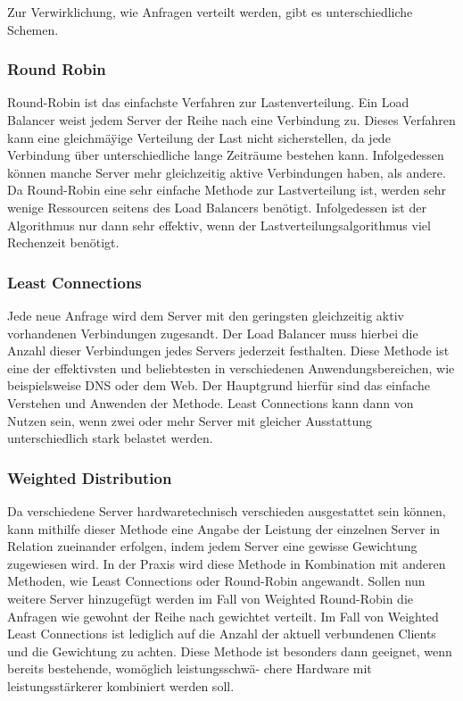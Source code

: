 \documentclass[letterpaper, 12pt]{article}
\let\tempsubsubsection\subsubsection
\renewcommand\subsubsection[1]{\vspace{0cm}\tempsubsubsection{#1}\vspace{0cm}}
\begin{document}
Zur Verwirklichung, wie Anfragen verteilt werden, gibt es unterschiedliche Schemen.

\subsubsection{Round Robin}

Round-Robin ist das einfachste Verfahren zur Lastenverteilung. Ein Load Balancer weist jedem
Server der Reihe nach eine Verbindung zu. Dieses Verfahren kann eine gleichmäÿige Verteilung der
Last nicht sicherstellen, da jede Verbindung über unterschiedliche lange Zeiträume bestehen kann.
Infolgedessen können manche Server mehr gleichzeitig aktive Verbindungen haben, als andere. Da Round-Robin eine sehr einfache Methode zur Lastverteilung ist, werden sehr wenige Ressourcen
seitens des Load Balancers benötigt. Infolgedessen ist der Algorithmus nur dann sehr effektiv, wenn
der Lastverteilungsalgorithmus viel Rechenzeit benötigt. \cite{ausarbeitunglb}

\subsubsection{Least Connections}

Jede neue Anfrage wird dem Server mit den geringsten gleichzeitig aktiv vorhandenen Verbindungen
zugesandt. Der Load Balancer muss hierbei die Anzahl dieser Verbindungen jedes Servers
jederzeit festhalten. Diese Methode ist eine der effektivsten und beliebtesten in verschiedenen
Anwendungsbereichen, wie beispielsweise DNS oder dem Web. Der Hauptgrund hierfür sind das
einfache Verstehen und Anwenden der Methode. Least Connections kann dann von Nutzen sein, wenn zwei oder mehr Server mit gleicher Ausstattung unterschiedlich stark belastet werden. \cite{ausarbeitunglb}

\subsubsection{Weighted Distribution}

Da verschiedene Server hardwaretechnisch verschieden ausgestattet sein können, kann mithilfe dieser
Methode eine Angabe der Leistung der einzelnen Server in Relation zueinander erfolgen, indem
jedem Server eine gewisse Gewichtung zugewiesen wird. In der Praxis wird diese Methode in Kombination mit anderen Methoden, wie Least Connections
oder Round-Robin angewandt. Sollen nun weitere Server hinzugefügt werden im Fall von Weighted
Round-Robin die Anfragen wie gewohnt der Reihe nach gewichtet verteilt. Im Fall von Weighted
Least Connections ist lediglich auf die Anzahl der aktuell verbundenen Clients und die Gewichtung zu achten. Diese Methode ist besonders dann geeignet, wenn bereits bestehende, womöglich leistungsschwä-
chere Hardware mit leistungsstärkerer kombiniert werden soll. \cite{ausarbeitunglb}
\end{document}
